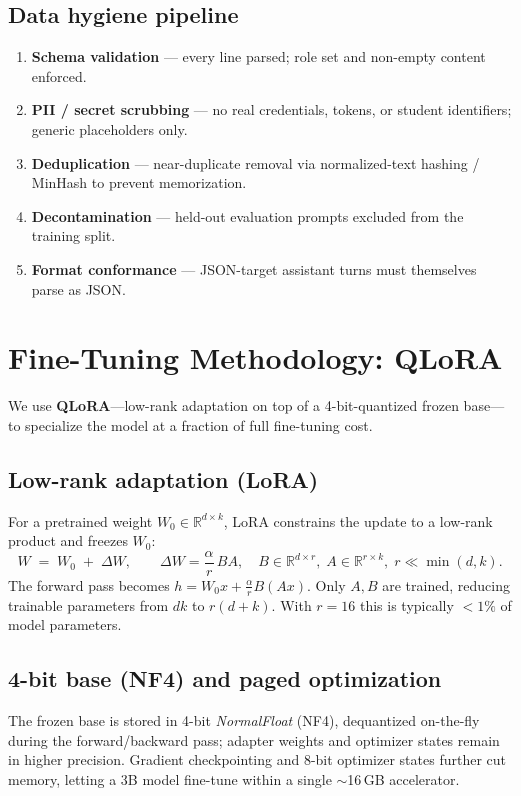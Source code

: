 \documentclass[11pt,a4paper]{article}
\begin{document}
\subsection{Data hygiene pipeline}
\begin{enumerate}[leftmargin=*]
  \item \textbf{Schema validation} --- every line parsed; role set and non-empty content enforced.
  \item \textbf{PII / secret scrubbing} --- no real credentials, tokens, or student identifiers; generic placeholders only.
  \item \textbf{Deduplication} --- near-duplicate removal via normalized-text hashing / MinHash to prevent memorization.
  \item \textbf{Decontamination} --- held-out evaluation prompts excluded from the training split.
  \item \textbf{Format conformance} --- JSON-target assistant turns must themselves parse as JSON.
\end{enumerate}

\section{Fine-Tuning Methodology: QLoRA}
We use \textbf{QLoRA}---low-rank adaptation on top of a 4-bit-quantized frozen
base---to specialize the model at a fraction of full fine-tuning cost.

\subsection{Low-rank adaptation (LoRA)}
For a pretrained weight $W_0 \in \mathbb{R}^{d\times k}$, LoRA constrains the
update to a low-rank product and freezes $W_0$:
\[
W \;=\; W_0 \;+\; \Delta W, \qquad \Delta W = \frac{\alpha}{r}\, B A,\quad
B \in \mathbb{R}^{d\times r},\; A \in \mathbb{R}^{r\times k},\; r \ll \min(d,k).
\]
The forward pass becomes $h = W_0 x + \frac{\alpha}{r} B(Ax)$. Only $A,B$ are
trained, reducing trainable parameters from $dk$ to $r(d{+}k)$. With
$r{=}16$ this is typically \textbf{$<1\%$} of model parameters.

\subsection{4-bit base (NF4) and paged optimization}
The frozen base is stored in 4-bit \emph{NormalFloat} (NF4), dequantized
on-the-fly during the forward/backward pass; adapter weights and optimizer
states remain in higher precision. Gradient checkpointing and 8-bit optimizer
states further cut memory, letting a 3B model fine-tune within a single
$\sim$16\,GB accelerator.
\end{document}

